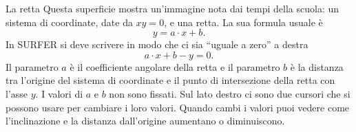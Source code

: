 \begin{surferPage}[Retta]{La retta}
Questa superficie mostra un'immagine nota dai tempi della scuola: un sistema di coordinate, date da $xy=0$, e una retta. La sua formula usuale \`e
\[y=a\cdot x + b.\]
In SURFER si deve scrivere in modo che ci sia ``uguale a zero'' a destra
\[a\cdot x +b -y=0.\]
Il parametro $a$ \`e il coefficiente angolare della retta e il parametro $b$ \`e la distanza tra l'origine del sistema di coordinate e il punto di intersezione della retta con l'asse $y$.
I valori di $a$ e $b$ non sono fissati. Sul lato destro ci sono due cursori che si possono usare per cambiare i loro valori. Quando cambi i valori puoi vedere come l'inclinazione e la distanza dall'origine aumentano o diminuiscono.
\end{surferPage}


